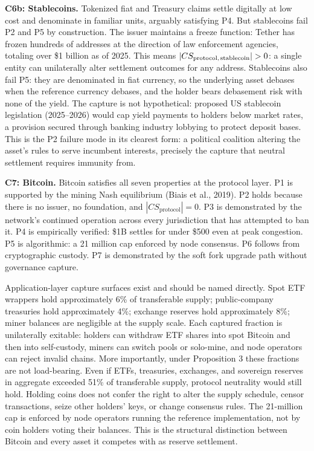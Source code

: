 \documentclass[12pt]{article}
\theoremstyle{definition}
\theoremstyle{remark}
\begin{document}
\noindent\textbf{C6b: Stablecoins.} Tokenized fiat and Treasury claims
settle digitally at low cost and denominate in familiar units, arguably
satisfying P4. But stablecoins fail P2 and P5 by construction. The issuer maintains a freeze function: Tether has frozen
hundreds of addresses at the direction of law enforcement agencies,
totaling over \$1 billion as of 2025. This means
$|CS_\text{protocol,\,stablecoin}| > 0$: a single entity can unilaterally alter
settlement outcomes for any address. Stablecoins also fail P5: they are
denominated in fiat currency, so the underlying asset debases when the
reference currency debases, and the holder bears debasement risk with
none of the yield. The capture is not hypothetical: proposed US
stablecoin legislation (2025--2026) would cap yield payments to holders
below market rates, a provision secured through banking industry
lobbying to protect deposit bases. This is the P2 failure mode in its
clearest form: a political coalition altering the asset's rules to
serve incumbent interests, precisely the capture that neutral
settlement requires immunity from.

\noindent\textbf{C7: Bitcoin.} Bitcoin satisfies all seven properties at
the protocol layer. P1 is supported by the mining Nash equilibrium
(Biais et al., 2019). P2 holds because there is no issuer, no
foundation, and $|CS_\text{protocol}| = 0$. P3 is demonstrated by the
network's continued operation across every jurisdiction that has
attempted to ban it. P4 is empirically verified: \$1B settles for
under \$500 even at peak congestion. P5 is algorithmic: a 21 million
cap enforced by node consensus. P6 follows from cryptographic custody.
P7 is demonstrated by the soft fork upgrade path without governance
capture.

Application-layer capture surfaces exist and should be named directly.
Spot ETF wrappers hold approximately 6\% of transferable supply;
public-company treasuries hold approximately 4\%; exchange reserves
hold approximately 8\%; miner balances are negligible at the supply
scale. Each captured fraction is unilaterally exitable: holders can
withdraw ETF shares into spot Bitcoin and then into self-custody,
miners can switch pools or solo-mine, and node operators can reject
invalid chains. More importantly, under Proposition 3 these fractions
are not load-bearing. Even if ETFs, treasuries, exchanges, and
sovereign reserves in aggregate exceeded 51\% of transferable supply,
protocol neutrality would still hold. Holding coins does not confer
the right to alter the supply schedule, censor transactions, seize
other holders' keys, or change consensus rules. The 21-million cap is
enforced by node operators running the reference implementation, not
by coin holders voting their balances. This is the structural
distinction between Bitcoin and every asset it competes with as
reserve settlement.
\end{document}
